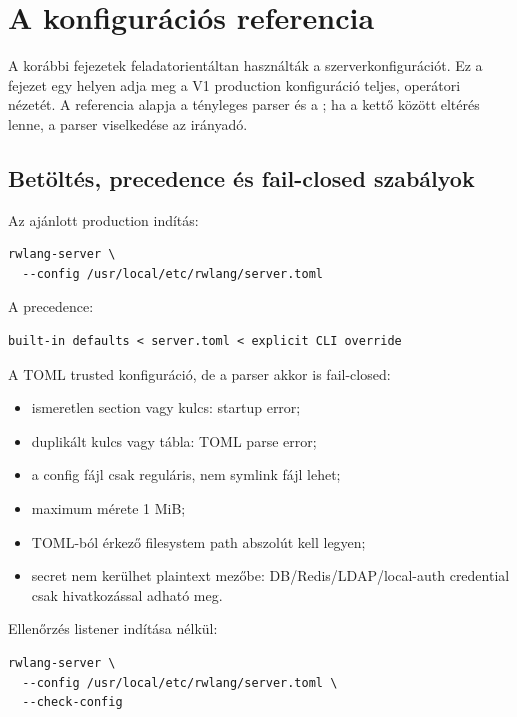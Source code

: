 \chapter{A  konfigurációs referencia}

A korábbi fejezetek feladatorientáltan használták a szerverkonfigurációt. Ez a fejezet egy helyen adja meg a V1 production konfiguráció teljes, operátori nézetét. A referencia alapja a tényleges parser és a ; ha a kettő között eltérés lenne, a parser viselkedése az irányadó.

\section{Betöltés, precedence és fail-closed szabályok}

Az ajánlott production indítás:

\begin{lstlisting}
rwlang-server \
  --config /usr/local/etc/rwlang/server.toml
\end{lstlisting}

A precedence:

\begin{lstlisting}
built-in defaults < server.toml < explicit CLI override
\end{lstlisting}

A TOML trusted konfiguráció, de a parser akkor is fail-closed:

\begin{itemize}
  \item ismeretlen section vagy kulcs: startup error;
  \item duplikált kulcs vagy tábla: TOML parse error;
  \item a config fájl csak reguláris, nem symlink fájl lehet;
  \item maximum mérete 1 MiB;
  \item TOML-ból érkező filesystem path abszolút kell legyen;
  \item secret nem kerülhet plaintext mezőbe: DB/Redis/LDAP/local-auth credential csak  hivatkozással adható meg.
\end{itemize}

Ellenőrzés listener indítása nélkül:

\begin{lstlisting}
rwlang-server \
  --config /usr/local/etc/rwlang/server.toml \
  --check-config
\end{lstlisting}

